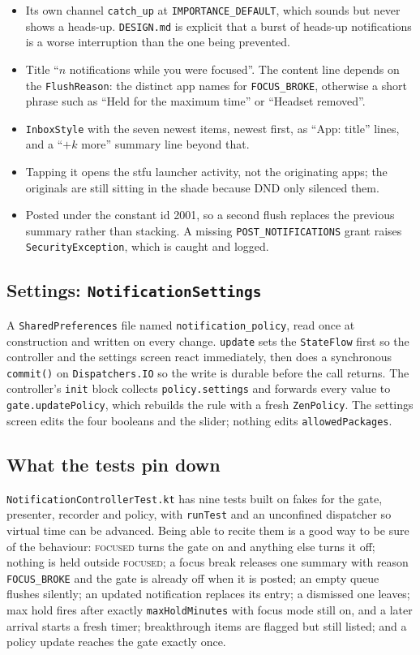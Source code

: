 \documentclass[10pt,a4paper]{article}
\newcommand{\file}[1]{\texttt{\small #1}}          %
\newcommand{\code}[1]{\texttt{#1}}                  %
\newcommand{\state}[1]{\textsc{\small #1}}          %
\begin{document}
\begin{itemize}
\item Its own channel \code{catch\_up} at \code{IMPORTANCE\_DEFAULT}, which sounds but never
  shows a heads-up. \file{DESIGN.md} is explicit that a burst of heads-up notifications is a worse
  interruption than the one being prevented.
\item Title ``$n$ notifications while you were focused''. The content line depends on the
  \code{FlushReason}: the distinct app names for \code{FOCUS\_BROKE}, otherwise a short phrase
  such as ``Held for the maximum time'' or ``Headset removed''.
\item \code{InboxStyle} with the seven newest items, newest first, as ``App: title'' lines, and a
  ``$+k$ more'' summary line beyond that.
\item Tapping it opens the stfu launcher activity, not the originating apps; the originals are
  still sitting in the shade because DND only silenced them.
\item Posted under the constant id 2001, so a second flush replaces the previous summary rather
  than stacking. A missing \code{POST\_NOTIFICATIONS} grant raises \code{SecurityException},
  which is caught and logged.
\end{itemize}

\subsection{Settings: \code{NotificationSettings}}

A \code{SharedPreferences} file named \code{notification\_policy}, read once at construction and
written on every change. \code{update} sets the \code{StateFlow} first so the controller and the
settings screen react immediately, then does a synchronous \code{commit()} on \code{Dispatchers.IO}
so the write is durable before the call returns. The controller's \code{init} block collects
\code{policy.settings} and forwards every value to \code{gate.updatePolicy}, which rebuilds the rule
with a fresh \code{ZenPolicy}. The settings screen edits the four booleans and the slider; nothing
edits \code{allowedPackages}.

\subsection{What the tests pin down}

\file{NotificationControllerTest.kt} has nine tests built on fakes for the gate, presenter,
recorder and policy, with \code{runTest} and an unconfined dispatcher so virtual time can be
advanced. Being able to recite them is a good way to be sure of the behaviour: \state{focused}
turns the gate on and anything else turns it off; nothing is held outside \state{focused}; a focus
break releases one summary with reason \code{FOCUS\_BROKE} and the gate is already off when it is
posted; an empty queue flushes silently; an updated notification replaces its entry; a dismissed
one leaves; max hold fires after exactly \code{maxHoldMinutes} with focus mode still on, and a
later arrival starts a fresh timer; breakthrough items are flagged but still listed; and a policy
update reaches the gate exactly once.
\end{document}
